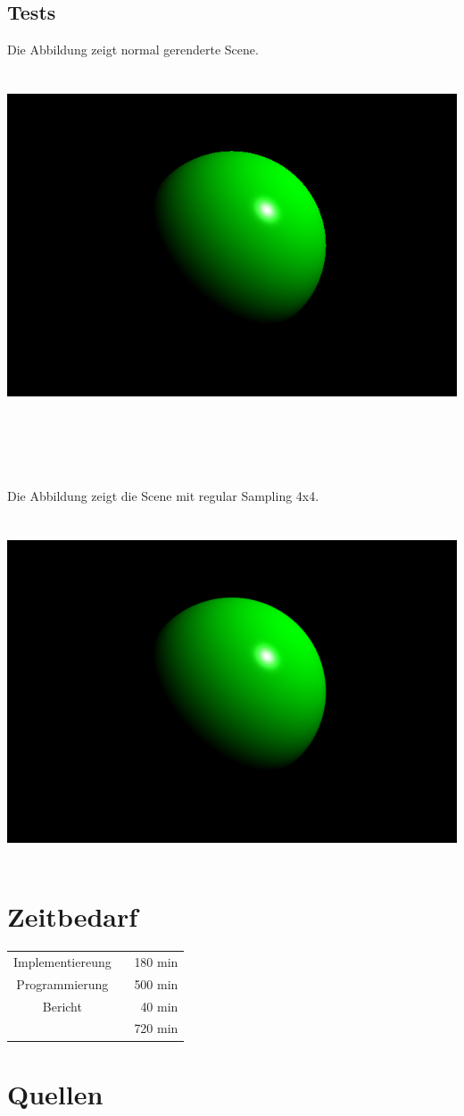 \documentclass[14pt]{extarticle}
\begin{document}
\subsection{Tests}
Die Abbildung zeigt normal gerenderte Scene.\\\\
\includegraphics[width=15cm,height=10cm]{images/sample1.png}\\\\\\\\\\
Die Abbildung zeigt die Scene mit  regular Sampling 4x4.\\\\
\includegraphics[width=15cm,height=10cm]{images/sample4x4.png}\\

\section{Zeitbedarf}
\begin{center}
\begin{tabular}{cr}

Implementiereung 	\	&180 min	\\
Programmierung \	&500 min	\\

Bericht  \		&40 min	 \\
	\hline
	&720 min
\end{tabular}
\end{center}

\section{Quellen}
\end{document}
